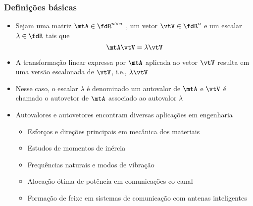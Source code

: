 \begin{frame}
  \frametitle{Definições básicas}
  \begin{itemize}
    \item Sejam uma matriz $\mtA \in \fdR^{n\times n}$ , um vetor $\vtV \in \fdR^{n}$ e um escalar $\lambda \in \fdR$ tais que %
    \begin{equation}\label{eq_auto}
      \mtA\vtV = \lambda\vtV
    \end{equation}
    \item A transformação linear expressa por $\mtA$ aplicada ao vetor $\vtV$ resulta em uma versão escalonada de $\vtV$, i.e., $\lambda\vtV$
    \item Nesse caso, o escalar $\lambda$ é denominado um {\alert{autovalor}} de $\mtA$ e $\vtV$ é chamado o {\alert{autovetor}} de $\mtA$ associado ao autovalor $\lambda$
    \item Autovalores e autovetores encontram diversas aplicações em engenharia
    \begin{itemize}
      \item Esforços e direções principais em mecânica dos materiais
      \item Estudos de momentos de inércia
      \item Frequências naturais e modos de vibração
      \item Alocação ótima de potência em comunicações co-canal
      \item Formação de feixe em sistemas de comunicação com antenas inteligentes
    \end{itemize}
  \end{itemize}
\end{frame}

